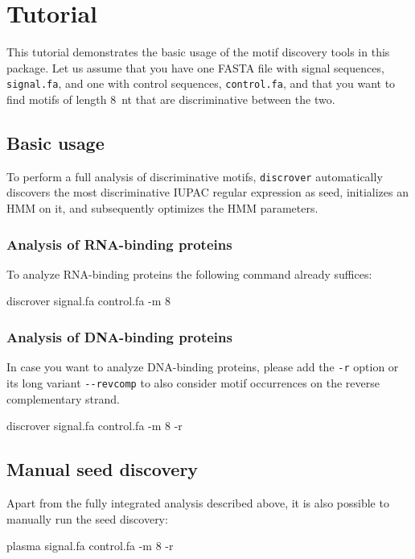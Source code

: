 \documentclass[a4paper]{article}
\newcommand{\discrover}[0]{\texttt{discrover}}
\newcommand{\ignore}[1]{}
\begin{document}
\ignore{%
\subsection{Seeding}
To be written.
\subsection{Binding site HMM optimization}
To be written.
}

\section{Tutorial}
This tutorial demonstrates the basic usage of the motif discovery tools in this package.
Let us assume that you have one FASTA file with signal sequences, \verb|signal.fa|, and one with control sequences, \verb|control.fa|, and that you want to find motifs of length 8~nt that are discriminative between the two.
\subsection{Basic usage}
To perform a full analysis of discriminative motifs, \discrover{} automatically discovers the most discriminative IUPAC regular expression as seed, initializes an HMM on it, and subsequently optimizes the HMM parameters.
\subsubsection{Analysis of RNA-binding proteins}
To analyze RNA-binding proteins the following command already suffices:\\
\begin{verbbox}
discrover signal.fa control.fa -m 8
\end{verbbox}
\fbox{\theverbbox[t]}

\subsubsection{Analysis of DNA-binding proteins}
In case you want to analyze DNA-binding proteins, please add the \verb|-r| option or its long variant \verb|--revcomp| to also consider motif occurrences on the reverse complementary strand.\\
\begin{verbbox}
discrover signal.fa control.fa -m 8 -r
\end{verbbox}
\fbox{\theverbbox[t]}

\subsection{Manual seed discovery}
\label{tutorial:plasma}
Apart from the fully integrated analysis described above, it is also possible to manually run the seed discovery:\\
\begin{verbbox}
plasma signal.fa control.fa -m 8 -r
\end{verbbox}
\fbox{\theverbbox[t]}
\end{document}
